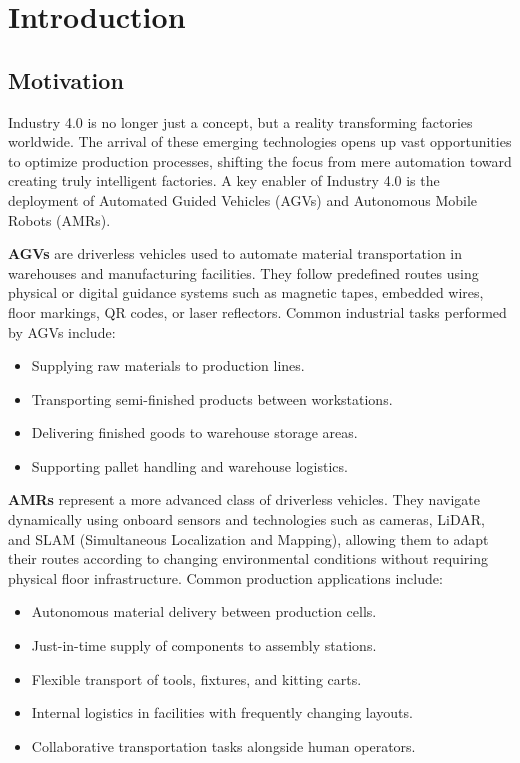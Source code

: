 \chapter{Introduction}
\label{chap:introduction}

\section{Motivation}
Industry 4.0 is no longer just a concept, but a reality transforming factories worldwide. 
The arrival of these emerging technologies opens up vast opportunities to optimize production processes, shifting the focus from mere automation toward creating truly intelligent factories.
A key enabler of Industry 4.0 is the deployment of Automated Guided Vehicles (AGVs) and Autonomous Mobile Robots (AMRs).

\textbf{AGVs} are driverless vehicles used to automate material transportation in warehouses and manufacturing facilities. 
They follow predefined routes using physical or digital guidance systems such as magnetic tapes, embedded wires, floor markings, QR codes, or laser reflectors. 
Common industrial tasks performed by AGVs include: 
\begin{itemize} 
    \item Supplying raw materials to production lines. 
    \item Transporting semi-finished products between workstations. 
    \item Delivering finished goods to warehouse storage areas. 
    \item Supporting pallet handling and warehouse logistics. 
\end{itemize} 

\textbf{AMRs} represent a more advanced class of driverless vehicles. 
They navigate dynamically using onboard sensors and technologies such as cameras, LiDAR, and SLAM (Simultaneous Localization and Mapping), allowing them to adapt their routes according to changing environmental conditions without requiring physical floor infrastructure. 
Common production applications include: 
\begin{itemize} 
    \item Autonomous material delivery between production cells. 
    \item Just-in-time supply of components to assembly stations. 
    \item Flexible transport of tools, fixtures, and kitting carts. 
    \item Internal logistics in facilities with frequently changing layouts. 
    \item Collaborative transportation tasks alongside human operators. 
\end{itemize}


